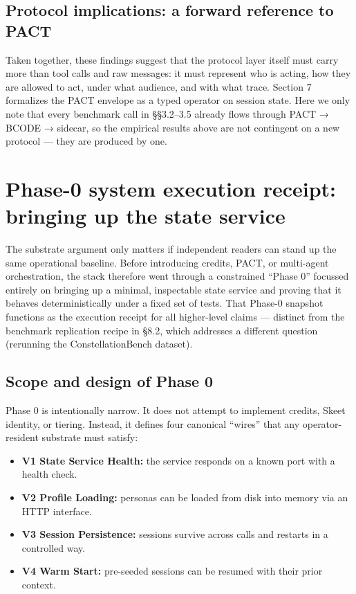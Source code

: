 \documentclass{article}
\providecommand{\tightlist}{\setlength{\itemsep}{0pt}\setlength{\parskip}{0pt}}
\begin{document}
\subsection{Protocol implications: a forward reference to
PACT}\label{protocol-implications-a-forward-reference-to-pact}

Taken together, these findings suggest that the protocol layer itself
must carry more than tool calls and raw messages: it must represent who
is acting, how they are allowed to act, under what audience, and with
what trace. Section 7 formalizes the PACT envelope as a typed operator
on session state. Here we only note that every benchmark call in
§§3.2--3.5 already flows through PACT → BCODE → sidecar, so the
empirical results above are not contingent on a new protocol --- they
are produced by one.

\section{Phase-0 system execution receipt: bringing up the state
service}\label{phase-0-system-execution-receipt-bringing-up-the-state-service}

The substrate argument only matters if independent readers can stand up
the same operational baseline. Before introducing credits, PACT, or
multi-agent orchestration, the stack therefore went through a
constrained ``Phase 0'' focussed entirely on bringing up a minimal,
inspectable state service and proving that it behaves deterministically
under a fixed set of tests. That Phase-0 snapshot functions as the
execution receipt for all higher-level claims --- distinct from the
benchmark replication recipe in §8.2, which addresses a different
question (rerunning the ConstellationBench dataset).

\subsection{Scope and design of Phase
0}\label{scope-and-design-of-phase-0}

Phase 0 is intentionally narrow. It does not attempt to implement
credits, Skeet identity, or tiering. Instead, it defines four canonical
``wires'' that any operator-resident substrate must satisfy:

\begin{itemize}
\tightlist
\item
  \textbf{V1 State Service Health:} the service responds on a known port
  with a health check.
\item
  \textbf{V2 Profile Loading:} personas can be loaded from disk into
  memory via an HTTP interface.
\item
  \textbf{V3 Session Persistence:} sessions survive across calls and
  restarts in a controlled way.
\item
  \textbf{V4 Warm Start:} pre-seeded sessions can be resumed with their
  prior context.
\end{itemize}
\end{document}

